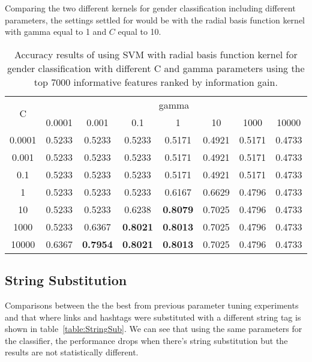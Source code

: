 \documentclass[a4paper]{llncs}
\begin{document}
Comparing the two different kernels for gender classification including different parameters, the settings settled for would be with the radial basis function kernel with gamma equal to 1 and $C$ equal to 10.  

\begin{table}[!htbp]
\centering
\begin{tabular}{|c|c|c|c|c|c|c|c|}
\hline
\multirow{2}{*}{C} & \multicolumn{7}{c|}{gamma}                                            \\ \cline{2-8} 
                   & 0.0001 & 0.001  & 0.1    & 1               & 10     & 1000   & 10000  \\ \hline
0.0001             & 0.5233 & 0.5233 & 0.5233 & 0.5171          & 0.4921 & 0.5171 & 0.4733 \\ \hline
0.001              & 0.5233 & 0.5233 & 0.5233 & 0.5171          & 0.4921 & 0.5171 & 0.4733 \\ \hline
0.1                & 0.5233 & 0.5233 & 0.5233 & 0.5171          & 0.4921 & 0.5171 & 0.4733 \\ \hline
1                  & 0.5233 & 0.5233 & 0.5233 & 0.6167          & 0.6629 & 0.4796 & 0.4733 \\ \hline
10                 & 0.5233 & 0.5233 & 0.6238 & \textbf{0.8079} & 0.7025 & 0.4796 & 0.4733 \\ \hline
1000               & 0.5233 & 0.6367 & \textbf{0.8021} & \textbf{0.8013} & 0.7025 & 0.4796 & 0.4733 \\ \hline
10000              & 0.6367 & \textbf{0.7954} & \textbf{0.8021} & \textbf{0.8013} & 0.7025 & 0.4796 & 0.4733 \\ \hline
\end{tabular}
\caption{Accuracy results of using SVM with radial basis function kernel for gender classification with different C and gamma parameters using the top 7000 informative features ranked by information gain.}
\label{table:SVMRBFGender}
\end{table}


\subsection{String Substitution}
Comparisons between the the best from previous parameter tuning experiments and that where links and hashtags were substituted with a different string tag is shown in table~\ref{table:StringSub}. We can see that using the same parameters for the classifier, the performance drops when there's string substitution but the results are not statistically different. 
\end{document}
